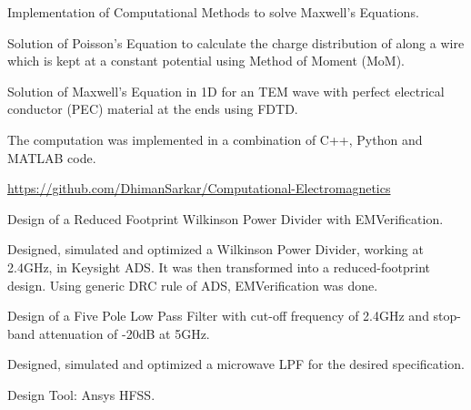 \begin{cventries}
  \cventry
    {Implementation of Computational Methods to solve Maxwell's Equations.} %
    {} %
    {} %
    {} %
    {
      \begin{cvitems} %
        \item {Solution of Poisson's Equation to calculate the charge distribution of along a wire which is kept at a constant potential using Method of Moment (MoM).}
        \item {Solution of Maxwell's Equation in 1D for an TEM wave with perfect electrical conductor (PEC) material at the ends using FDTD.}
        \item {The computation was implemented in a combination of C++, Python and MATLAB code.}
        \item {\href{https://github.com/DhimanSarkar/Computational-Electromagnetics}{https://github.com/DhimanSarkar/Computational-Electromagnetics}}
      \end{cvitems}
    }


  \cventry
    {Design of a Reduced Footprint Wilkinson Power Divider with EMVerification.} %
    {} %
    {} %
    {} %
    {
      \begin{cvitems} %
        \item {Designed, simulated and optimized a Wilkinson Power Divider, working at 2.4GHz, in Keysight ADS. It was then transformed into a reduced-footprint design. Using generic DRC rule of ADS, EMVerification was done.}
      \end{cvitems}
    }


  \cventry
    {Design of a Five Pole Low Pass Filter with cut-off frequency of 2.4GHz and stop-band attenuation of -20dB at 5GHz.} %
    {} %
    {} %
    {} %
    {
      \begin{cvitems} %
        \item {Designed, simulated and optimized a microwave LPF for the desired specification.}
        \item {Design Tool: Ansys HFSS.}
      \end{cvitems}
    }


\end{cventries}

